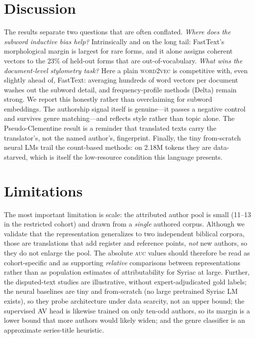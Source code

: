 \documentclass[11pt]{article}
\newcommand{\auc}{\textsc{auc}}
\newcommand{\auc}{\textsc{auc}}
\begin{document}


\section{Discussion}
\label{sec:discussion}
The results separate two questions that are often conflated. \emph{Where does the
subword inductive bias help?} Intrinsically and on the long tail: FastText's
morphological margin is largest for rare forms, and it alone assigns coherent
vectors to the 23\% of held-out forms that are out-of-vocabulary. \emph{What
wins the document-level stylometry task?} Here a plain \textsc{word2vec} is
competitive with, even slightly ahead of, FastText: averaging hundreds of word
vectors per document washes out the subword detail, and frequency-profile methods
(Delta) remain strong. We report this honestly rather than overclaiming for
subword embeddings. The authorship signal itself is genuine---it passes a
negative control and survives genre matching---and reflects style rather than
topic alone. The Pseudo-Clementine result is a reminder that translated texts
carry the translator's, not the named author's, fingerprint. Finally, the tiny
from-scratch neural LMs trail the count-based methods: on 2.18M tokens they are
data-starved, which is itself the low-resource condition this language presents.

\section{Limitations}
\label{sec:limitations}
The most important limitation is scale: the attributed author pool is small
(11--13 in the restricted cohort) and drawn from a \emph{single} authored corpus.
Although we validate that the representation generalizes to two independent
biblical corpora, those are translations that add register and reference points,
\emph{not} new authors, so they do not enlarge the pool. The absolute \auc{}
values should therefore be read as cohort-specific and as supporting
\emph{relative} comparisons between representations rather than as population
estimates of attributability for Syriac at large. Further, the disputed-text
studies are illustrative, without expert-adjudicated gold labels; the neural
baselines are tiny and from-scratch (no large pretrained Syriac LM exists), so
they probe architecture under data scarcity, not an upper bound; the supervised
AV head is likewise trained on only ten-odd authors, so its margin is a lower
bound that more authors would likely widen; and the genre classifier is an
approximate series-title heuristic.
\end{document}

